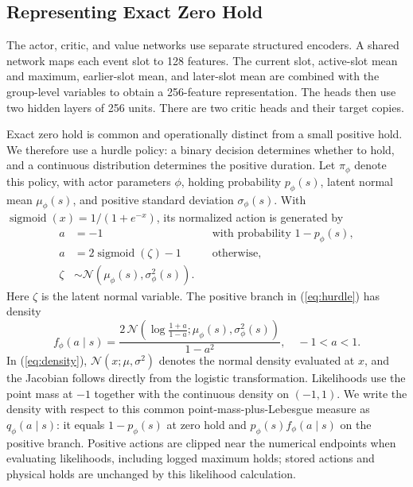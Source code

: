 \documentclass[letterpaper,journal]{IEEEtran}
\newcommand{\sigmoid}{\operatorname{sigmoid}}
\begin{document}
\subsection{Representing Exact Zero Hold}
The actor, critic, and value networks use separate structured encoders. A shared network maps each event slot to 128 features. The current slot, active-slot mean and maximum, earlier-slot mean, and later-slot mean are combined with the group-level variables to obtain a 256-feature representation. The heads then use two hidden layers of 256 units. There are two critic heads and their target copies.

Exact zero hold is common and operationally distinct from a small positive hold. We therefore use a hurdle policy: a binary decision determines whether to hold, and a continuous distribution determines the positive duration. Let \(\pi_\phi\) denote this policy, with actor parameters \(\phi\), holding probability \(p_\phi(s)\), latent normal mean \(\mu_\phi(s)\), and positive standard deviation \(\sigma_\phi(s)\). With \(\sigmoid(x)=1/(1+e^{-x})\), its normalized action is generated by
\begin{equation}
\begin{aligned}
 a&=-1 &&\text{with probability }1-p_\phi(s),\\
 a&=2\sigmoid(\zeta)-1 &&\text{otherwise},\\
 \zeta&\sim\mathcal{N}(\mu_\phi(s),\sigma_\phi^2(s)).
\end{aligned}
\label{eq:hurdle}
\end{equation}
Here \(\zeta\) is the latent normal variable. The positive branch in (\ref{eq:hurdle}) has density
\begin{equation}
 f_\phi(a\mid s)=
 \frac{2\,\mathcal{N}\!\left(\log\frac{1+a}{1-a};
                 \mu_\phi(s),\sigma_\phi^2(s)\right)}{1-a^2},
 \quad -1<a<1 .
 \label{eq:density}
\end{equation}
In (\ref{eq:density}), \(\mathcal{N}(x;\mu,\sigma^2)\) denotes the normal density evaluated at \(x\), and the Jacobian follows directly from the logistic transformation. Likelihoods use the point mass at \(-1\) together with the continuous density on \((-1,1)\). We write the density with respect to this common point-mass-plus-Lebesgue measure as \(q_\phi(a\mid s)\): it equals \(1-p_\phi(s)\) at zero hold and \(p_\phi(s)f_\phi(a\mid s)\) on the positive branch. Positive actions are clipped near the numerical endpoints when evaluating likelihoods, including logged maximum holds; stored actions and physical holds are unchanged by this likelihood calculation.
\end{document}
